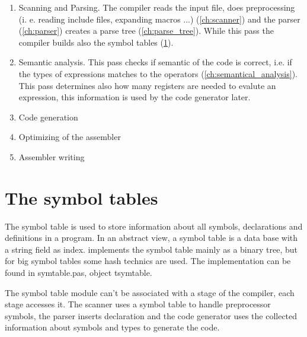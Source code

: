 \begin{enumerate}
\item Scanning and Parsing. The compiler reads the input file,
does preprocessing (i. e.
reading include files, expanding macros ...) (\ref{ch:scanner})
and the parser (\ref{ch:parser}) creates a parse tree (\ref{ch:parse_tree}).
While this pass the compiler builds also the symbol tables
(\ref{ch:symbol_tables}).
\item Semantic analysis. This pass checks if semantic of
the code is correct, i.e. if the types of expressions matches
to the operators (\ref{ch:semantical_analysis}). This pass determines
also how many registers are needed to evalute an expression, this
information is used by the code generator later.
\item Code generation
\item Optimizing of the assembler
\item Assembler writing
\end{enumerate}

\label{ch:scanner}

\chapter{The symbol tables}
\label{ch:symbol_tables}

The symbol table is used to store information about all
symbols, declarations and definitions in a program.
In an abstract view, a symbol table is a data base with a string field
as index. \fpc implements the symbol table mainly as a binary tree, but
for big symbol tables some hash technics are used. The implementation
can be found in symtable.pas, object tsymtable.

The symbol table module can't be associated with a stage of the compiler,
each stage accesses it.
The scanner uses a symbol table to handle preprocessor symbols, the
parser inserts declaration and the code generator uses the collected
information about symbols and types to generate the code.

